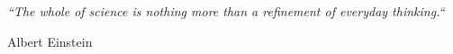\documentclass[a4paper, 11pt, oneside]{Thesis}
\begin{document}

\pagestyle{empty}  %

\null\vfill

\textit{``The whole of science is nothing more than a refinement of everyday thinking.``}

\begin{flushright}
	Albert Einstein\\
\end{flushright}

\vfill\vfill\vfill\vfill\vfill\vfill\null
\clearpage  %
\end{document}
